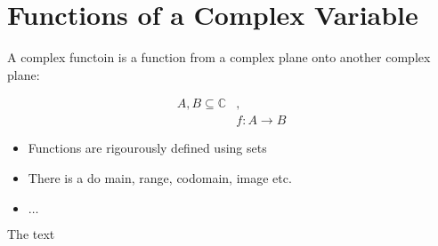 \documentclass[class=article, crop=false]{standalone}
\begin{document}
\section{Functions of a Complex Variable}
\label{sec:funct-compl-vari}

A complex functoin is a function from a complex plane onto another complex plane:

\begin{align*}
  A, B \subseteq \mathbb{C} &, \\
  & f: A \rightarrow B
\end{align*}

  \begin{itemize}
    \item Functions are rigourously defined using sets
    \item There is a do main, range, codomain, image etc.
    \item $\dots$
  \end{itemize}

The text  \cite{Churchill2013}
\end{document}
